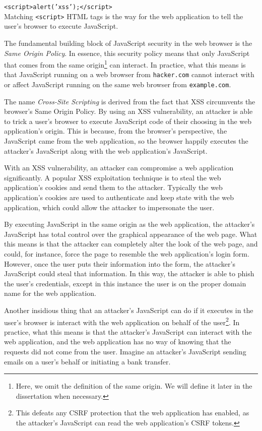 \noindent\texttt{<script>alert('xss');</script>}
\\

Matching \texttt{<script>} HTML tags is the way for the web
application to tell the user's browser to execute JavaScript.

The fundamental building block of JavaScript security in the web
browser is the \emph{Same Origin Policy}. In essence, this security
policy means that only JavaScript that comes from the same
origin\footnote{Here, we omit the definition of the same origin. We
  will define it later in the dissertation when necessary.} can
interact. In practice, what this means is that JavaScript running on a
web browser from \texttt{hacker.com} cannot interact with or affect
JavaScript running on the same web browser from \texttt{example.com}.

The name \emph{Cross-Site Scripting} is derived from the fact that XSS
circumvents the browser's Same Origin Policy. By using an XSS
vulnerability, an attacker is able to trick a user's browser to
execute JavaScript code of their choosing in the web application's
origin. This is because, from the browser's perspective, the
JavaScript came from the web application, so the browser happily
executes the attacker's JavaScript along with the web application's
JavaScript.

With an XSS vulnerability, an attacker can compromise a web
application significantly. A popular XSS exploitation technique is to
steal the web application's cookies and send them to the attacker.
Typically the web application's cookies are used to authenticate and
keep state with the web application, which could allow the attacker to
impersonate the user.

By executing JavaScript in the same origin as the web application, the
attacker's JavaScript has total control over the graphical appearance
of the web page. What this means is that the attacker can completely
alter the look of the web page, and could, for instance, force the
page to resemble the web application's login form. However, once the
user puts their information into the form, the attacker's JavaScript
could steal that information. In this way, the attacker is able to
phish the user's credentials, except in this instance the user is on
the proper domain name for the web application.

Another insidious thing that an attacker's JavaScript can do if it
executes in the user's browser is interact with the web application on
behalf of the user\footnote{This defeats any CSRF protection that the
  web application has enabled, as the attacker's JavaScript can read
  the web application's CSRF tokens.}. In practice, what this means is
that the attacker's JavaScript can interact with the web application,
and the web application has no way of knowing that the requests did
not come from the user. Imagine an attacker's JavaScript sending
emails on a user's behalf or initiating a bank transfer.

